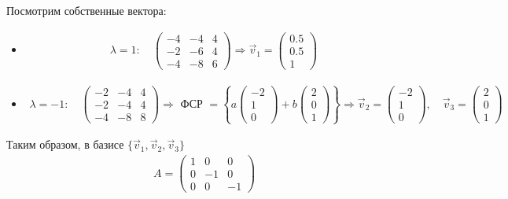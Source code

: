 \begin{solution}
    Посмотрим собственные вектора:
    \begin{itemize}
        \item
        \begin{gather}
            \lambda = 1:\quad
            \begin{pmatrix}
                -4 & -4 & 4 \\
                -2 & -6 & 4 \\
                -4 & -8 & 6
            \end{pmatrix} \Longrightarrow \vec{v}_1 = 
            \begin{pmatrix}
                0.5 \\ 0.5 \\ 1
            \end{pmatrix}
        \end{gather}
        \item
        \begin{gather}
            \lambda = -1: \quad 
            \begin{pmatrix}
                -2 & -4 & 4 \\
                -2 & -4 & 4 \\
                -4 & -8 & 8
            \end{pmatrix} \Longrightarrow \text{ ФСР } = \left\{
                a
                \begin{pmatrix}
                    -2 \\ 1 \\ 0
                \end{pmatrix} + b
                \begin{pmatrix}
                    2 \\ 0 \\ 1
                \end{pmatrix}
            \right\} \Longrightarrow \vec{v}_2 =
            \begin{pmatrix}
                -2 \\ 1 \\ 0
            \end{pmatrix}, \quad \vec{v}_3 = 
            \begin{pmatrix}
                2 \\ 0 \\ 1
            \end{pmatrix}
        \end{gather}
    \end{itemize}
    Таким образом, в базисе $\{\vec{v}_1,\vec{v}_2,\vec{v}_3\}$
    \begin{eqnarray}
        A = 
        \begin{pmatrix}
            1 &  0 &  0 \\
            0 & -1 &  0 \\
            0 &  0 & -1
        \end{pmatrix}
    \end{eqnarray}
\end{solution}